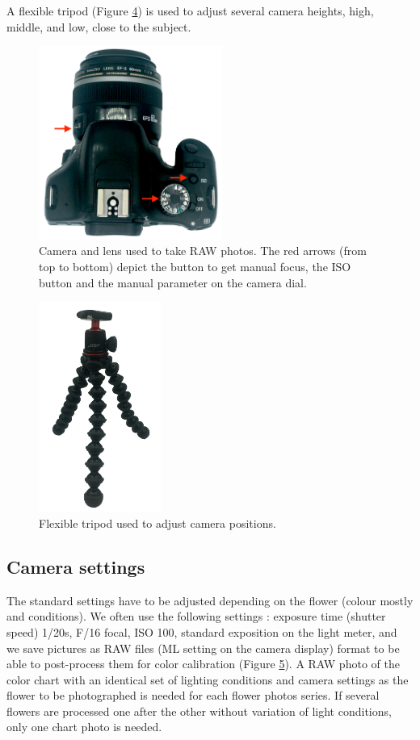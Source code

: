\documentclass[
]{book}
\theoremstyle{definition}
\theoremstyle{definition}
\theoremstyle{definition}
\theoremstyle{definition}
\theoremstyle{remark}
\begin{document}
A flexible tripod (Figure \protect\hyperlink{tripod}{4}) is used to adjust several camera heights, high,
middle, and low, close to the subject.

\begin{figure}
\hypertarget{camera_arrows}{%
\centering
\includegraphics[width=6cm,height=\textheight]{Figures/camera_arrows.png}
\caption{Camera and lens used to take RAW photos. The red arrows (from top to
bottom) depict the button to get manual focus, the ISO button and the
manual parameter on the camera
dial.}\label{camera_arrows}
}
\end{figure}

\begin{figure}
\hypertarget{tripod}{%
\centering
\includegraphics[width=4cm,height=\textheight]{Figures/tripod.png}
\caption{Flexible tripod used to adjust camera
positions.}\label{tripod}
}
\end{figure}

\hypertarget{camera-settings}{%
\subsection{Camera settings}\label{camera-settings}}

The standard settings have to be adjusted depending on the flower
(colour mostly and conditions). We often use the following settings :
exposure time (shutter speed) 1/20s, F/16 focal, ISO 100, standard
exposition on the light meter, and we save pictures as RAW files (ML
setting on the camera display) format to be able to post-process them
for color calibration (Figure \protect\hyperlink{fig:my_label}{5}). A RAW photo of the color chart with an
identical set of lighting conditions and camera settings as the flower
to be photographed is needed for each flower photos series. If several
flowers are processed one after the other without variation of light
conditions, only one chart photo is needed.
\end{document}
